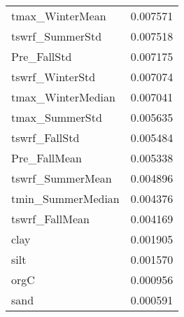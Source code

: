 \begin{tabular}{lr}
tmax_WinterMean & 0.007571 \\
tswrf_SummerStd & 0.007518 \\
Pre_FallStd & 0.007175 \\
tswrf_WinterStd & 0.007074 \\
tmax_WinterMedian & 0.007041 \\
tmax_SummerStd & 0.005635 \\
tswrf_FallStd & 0.005484 \\
Pre_FallMean & 0.005338 \\
tswrf_SummerMean & 0.004896 \\
tmin_SummerMedian & 0.004376 \\
tswrf_FallMean & 0.004169 \\
clay & 0.001905 \\
silt & 0.001570 \\
orgC & 0.000956 \\
sand & 0.000591 \\
\bottomrule
\end{tabular}
